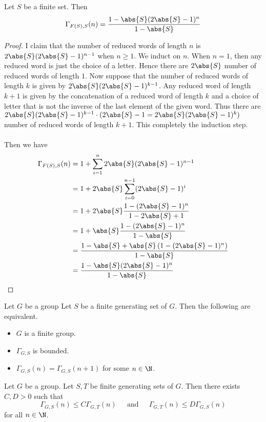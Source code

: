 \documentclass[a4paper]{article}
\begin{document}
\begin{lmm}{}{} Let $S$ be a finite set. Then $$\Gamma_{F(S),S}(n)=\frac{1-\abs{S}(2\abs{S}-1)^n}{1-\abs{S}}$$ \tcbline
\begin{proof}
I claim that the number of reduced words of length $n$ is $2\abs{S}(2\abs{S}-1)^{n-1}$ when $n\geq 1$. We induct on $n$. When $n=1$, then any reduced word is just the choice of a letter. Hence there are $2\abs{S}$ number of reduced words of length $1$. Now suppose that the number of reduced words of length $k$ is given by $2\abs{S}(2\abs{S}-1)^{k-1}$. Any reduced word of length $k+1$ is given by the concatenation of a reduced word of length $k$ and a choice of letter that is not the inverse of the last element of the given word. Thus there are $2\abs{S}(2\abs{S}-1)^{k-1}\cdot(2\abs{S}-1=2\abs{S}(2\abs{S}-1)^k)$ number of reduced words of length $k+1$. This completely the induction step. \\~\\

Then we have 
\begin{align*}
\Gamma_{F(S),S}(n)&=1+\sum_{i=1}^n2\abs{S}(2\abs{S}-1)^{n-1}\\
&=1+2\abs{S}\sum_{i=0}^{n-1}(2\abs{S}-1)^i\\
&=1+2\abs{S}\frac{1-(2\abs{S}-1)^n}{1-2\abs{S}+1}\\
&=1+\abs{S}\frac{1-(2\abs{S}-1)^n}{1-\abs{S}}\\
&=\frac{1-\abs{S}+\abs{S}\left(1-(2\abs{S}-1)^n\right)}{1-\abs{S}}\\
&=\frac{1-\abs{S}(2\abs{S}-1)^n}{1-\abs{S}}
\end{align*}
\end{proof}
\end{lmm}

\begin{prp}{}{} Let $G$ be a group Let $S$ be a finite generating set of $G$. Then the following are equivalent. 
\begin{itemize}
\item $G$ is a finite group. 
\item $\Gamma_{G,S}$ is bounded. 
\item $\Gamma_{G,S}(n)=\Gamma_{G,S}(n+1)$ for some $n\in\N$. 
\end{itemize}
\end{prp}

\begin{lmm}{}{} Let $G$ be a group. Let $S,T$ be finite generating sets of $G$. Then there exists $C,D>0$ such that $$\Gamma_{G,S}(n)\leq C\Gamma_{G,T}(n)\;\;\;\;\text{ and }\;\;\;\;\Gamma_{G,T}(n)\leq D\Gamma_{G,S}(n)$$ for all $n\in\N$. 
\end{lmm}
\end{document}
